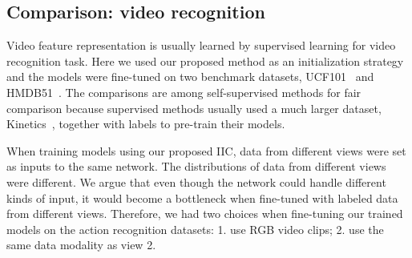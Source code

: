\documentclass[sigconf]{acmart}
\begin{document}
\begin{table}[t]
  \centering
  \caption{Video retrieval performance on HMDB51.}
\label{fig:retrieval hmdb}
\end{table}

\subsection{Comparison: video recognition}
Video feature representation is usually learned by supervised learning for video recognition task. Here we used our proposed method as an initialization strategy and the models were fine-tuned on two benchmark datasets, UCF101~\cite{ucf101} and HMDB51~\cite{hmdb}. The comparisons are among self-supervised methods for fair comparison because supervised methods usually used a much larger dataset, Kinetics~\cite{kinetics}, together with labels to pre-train their models.

When training models using our proposed IIC, data from different views were set as inputs to the same network. The distributions of data from different views were different. We argue that even though the network could handle different kinds of input, it would become a bottleneck when fine-tuned with labeled data from different views. Therefore, we had two choices when fine-tuning our trained models on the action recognition datasets: 1. use RGB video clips; 2. use the same data modality as view 2.
\end{document}
